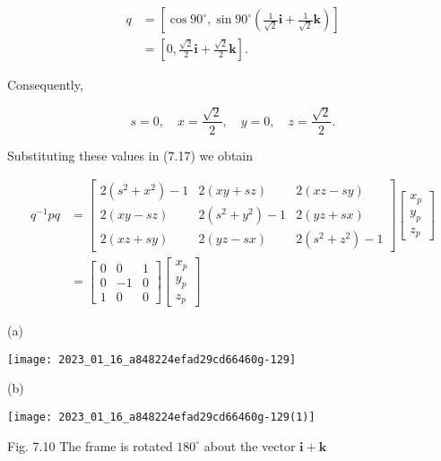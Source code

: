 $$
\begin{aligned}
q & =\left[\cos 90^{\circ}, \sin 90^{\circ}\left(\frac{1}{\sqrt{2}} \mathbf{i}+\frac{1}{\sqrt{2}} \mathbf{k}\right)\right] \\
& =\left[0, \frac{\sqrt{2}}{2} \mathbf{i}+\frac{\sqrt{2}}{2} \mathbf{k}\right] .
\end{aligned}
$$

Consequently,

$$
s=0, \quad x=\frac{\sqrt{2}}{2}, \quad y=0, \quad z=\frac{\sqrt{2}}{2} .
$$

Substituting these values in (7.17) we obtain

$$
\begin{aligned}
q^{-1} p q & =\left[\begin{array}{ccc}
2\left(s^{2}+x^{2}\right)-1 & 2(x y+s z) & 2(x z-s y) \\
2(x y-s z) & 2\left(s^{2}+y^{2}\right)-1 & 2(y z+s x) \\
2(x z+s y) & 2(y z-s x) & 2\left(s^{2}+z^{2}\right)-1
\end{array}\right]\left[\begin{array}{l}
x_{p} \\
y_{p} \\
z_{p}
\end{array}\right] \\
& =\left[\begin{array}{ccc}
0 & 0 & 1 \\
0 & -1 & 0 \\
1 & 0 & 0
\end{array}\right]\left[\begin{array}{l}
x_{p} \\
y_{p} \\
z_{p}
\end{array}\right]
\end{aligned}
$$

(a)

\begin{center}
\texttt{[image: 2023\_01\_16\_a848224efad29cd66460g-129]}
\end{center}

(b)

\begin{center}
\texttt{[image: 2023\_01\_16\_a848224efad29cd66460g-129(1)]}
\end{center}

Fig. 7.10 The frame is rotated $180^{\circ}$ about the vector $\mathbf{i}+\mathbf{k}$

